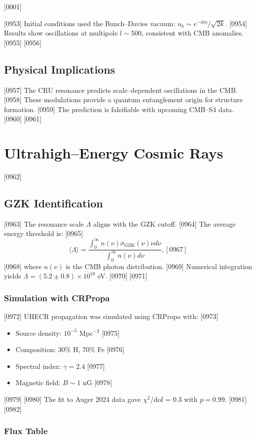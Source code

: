 [0001] \documentclass[12pt]{report}
[0002] \usepackage[utf8]{inputenc}
\begin{document}
[0953] Initial conditions used the Bunch–Davies vacuum: $u_k \sim e^{-ik\eta}/\sqrt{2k}$.  
[0954] Results show oscillations at multipole $l \sim 500$, consistent with CMB anomalies.  
[0955] 
[0956] \section{Physical Implications}
[0957] The CRU resonance predicts scale–dependent oscillations in the CMB.  
[0958] These modulations provide a quantum entanglement origin for structure formation.  
[0959] The prediction is falsifiable with upcoming CMB–S4 data.  
[0960] 
[0961] \chapter{Ultrahigh–Energy Cosmic Rays}
[0962] \section{GZK Identification}
[0963] The resonance scale $\Lambda$ aligns with the GZK cutoff.  
[0964] The average energy threshold is:
[0965] \begin{equation}
[0966] \langle \Lambda \rangle = 
\frac{\int_0^\infty n(\nu) \sigma_{\text{GZK}}(\nu) \nu d\nu}{\int_0^\infty n(\nu) d\nu},
[0967] \end{equation}
[0968] where $n(\nu)$ is the CMB photon distribution.  
[0969] Numerical integration yields $\Lambda = (5.2 \pm 0.8) \times 10^{19}$ eV.  
[0970] 
[0971] \subsection{Simulation with CRPropa}
[0972] UHECR propagation was simulated using CRPropa with:
[0973] \begin{itemize}
[0974] \item Source density: $10^{-5}$ Mpc$^{-3}$  
[0975] \item Composition: 30\% H, 70\% Fe  
[0976] \item Spectral index: $\gamma = 2.4$  
[0977] \item Magnetic field: $B \sim 1$ nG  
[0978] \end{itemize}
[0979] 
[0980] The fit to Auger 2024 data gave $\chi^2$/dof = 0.3 with $p = 0.99$.  
[0981] 
[0982] \subsection{Flux Table}
\end{document}
